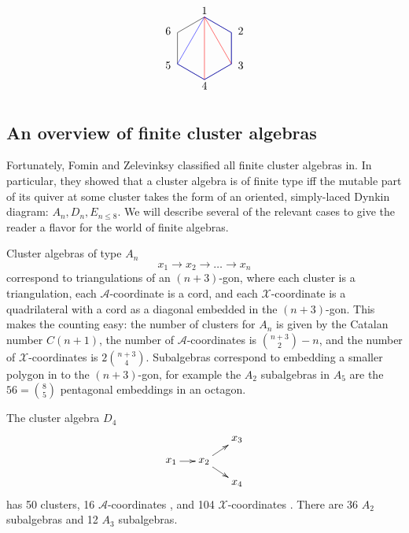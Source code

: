 \documentclass[11pt]{article}
\def\xcoord{$\mathcal{X}$-coordinate }
\def\xcoords{$\mathcal{X}$-coordinates }
\def\acoord{$\mathcal{A}$-coordinate }
\def\acoords{$\mathcal{A}$-coordinates }
\begin{document}
\begin{equation}
\begin{gathered}
\begin{tikzpicture}
	\coordinate (P1) at (90:1);
	\coordinate (P2) at (30:1);
	\coordinate (P3) at (330:1);
	\coordinate (P4) at (270:1);
	\coordinate (P5) at (210:1);
	\coordinate (P6) at (150:1);
	\draw (P1) -- (P2) -- (P3) -- (P4) -- (P5) -- (P6) -- cycle;
  	\draw[color=red] (P1) -- (P3);
  	\draw[color=red] (P1) -- (P4);
	\draw[color=blue] (P1) -- (P2) -- (P3) -- (P4) -- (P5) -- cycle;
	\draw (0,1.2) node {1};
	\draw (30:1.1) node[anchor=west] {2};
	\draw (330:1.1) node[anchor=west] {3};
	\draw (270:1.2) node {4};
	\draw (210:1.1) node[anchor=east] {5};
	\draw (150:1.1) node[anchor=east] {6};
\end{tikzpicture} 
\end{gathered}
\end{equation}
 


\subsection{An overview of finite cluster algebras}\label{sec:finite-algebras}
Fortunately, Fomin and Zelevinksy classified all finite cluster algebras in\cite{1054.17024}. In particular, they showed that a cluster algebra is of finite type iff the mutable part of its quiver at some cluster takes the form of an oriented, simply-laced Dynkin diagram: $A_n, D_n, E_{n\le8}$. We will describe several of the relevant cases to give the reader a flavor for the world of finite algebras. 

Cluster algebras of type $A_n$ 
\begin{equation}\label{def:An}
  x_1\to x_2\to \ldots \to x_n
\end{equation}
correspond to triangulations of an $(n+3)$-gon, where each cluster is a triangulation, each \acoord is a cord, and each \xcoord is a quadrilateral with a cord as a diagonal embedded in the $(n+3)$-gon. This makes the counting easy: the number of clusters for $A_n$ is given by the Catalan number $C(n+1)$, the number of \acoords is $\binom{n+3}{2}-n$, and the number of \xcoords is $2\binom{n+3}{4}$. Subalgebras correspond to embedding a smaller polygon in to the $(n+3)$-gon, for example the $A_2$ subalgebras in $A_5$ are the $56=\binom{8}{5}$ pentagonal embeddings in an octagon. 

The cluster algebra $D_4$
\begin{equation}\label{def:D4}
    \begin{gathered}
    \begin{xy} 0;<1pt,0pt>:<0pt,-1pt>::
      (0,20) *+{x_1} ="1",
      (30,20) *+{x_2} ="2",
      (60,0) *+{x_3} ="3",
      (60,40) *+{x_4} ="4",
      "1", {\ar"2"},
      "2", {\ar"3"},
      "2", {\ar"4"},
    \end{xy}
    \end{gathered}
\end{equation}
has 50 clusters, 16 \acoords, and 104 \xcoords. There are 36 $A_2$ subalgebras and 12 $A_3$ subalgebras. 
\end{document}
